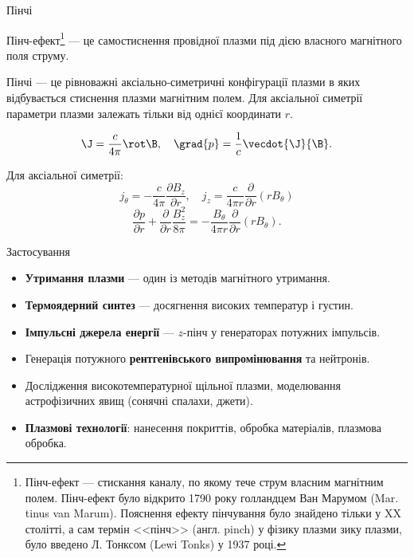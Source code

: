 \documentclass[]{beamer}
\begin{document}
\begin{frame}{Пінчі}
    \begin{block}{}
        Пінч-ефект\footnote{\justifying\tiny Пінч-ефект --- стискання каналу, по якому тече струм власним магнітним полем. Пінч-ефект було відкрито 1790 року голландцем Ван Марумом (Mar. tinus van Marum). Пояснення ефекту пінчування було знайдено тільки у XX столітті, а сам термін <<пінч>> (англ. pinch) у фізику плазми зику плазми, було введено Л. Тонксом (Lewi Tonks) у 1937 році.} --- це самостиснення провідної плазми під дією власного магнітного поля струму.
    \end{block}
	\begin{block}{}\justifying
		Пінчі --- це рівноважні аксіально-симетричні конфігурації плазми в яких відбувається стиснення плазми магнітним полем. Для аксіальної симетрії параметри плазми залежать тільки від однієї координати $r$.

		\begin{equation*}
			\J = \frac{c}{4\pi}\rot\B, \quad \grad{p} = \frac1c \vecdot{\J}{\B}.
		\end{equation*}

		Для аксіальної симетрії:
		\begin{equation*}
			j_{\theta} = -\frac{c}{4\pi}\frac{\partial B_z}{\partial r}, \quad j_z = \frac{c}{4\pi r} \frac{\partial }{\partial r}(r B_{\theta})
		\end{equation*}
		\begin{equation*}
			\frac{\partial p}{\partial r}  + \frac{\partial}{\partial r} \frac{B^2_z}{8\pi} = -\frac{B_{\theta}}{4\pi r}  \frac{\partial }{\partial r}(r B_{\theta}).
		\end{equation*}

	\end{block}
\end{frame}

\begin{frame}{Застосування}{}\small
    \begin{itemize}
    \item \textbf{Утримання плазми} --- один із методів магнітного утримання.
    \item \textbf{Термоядерний синтез} --- досягнення високих температур і густин.
    \item \textbf{Імпульсні джерела енергії} --- $z$-пінч у генераторах потужних імпульсів.
    \item Генерація потужного \textbf{рентгенівського випромінювання} та нейтронів.
    \item Дослідження високотемпературної щільної плазми, моделювання астрофізичних явищ (сонячні спалахи, джети).
    \item \textbf{Плазмові технології}: нанесення покриттів, обробка матеріалів, плазмова обробка.
\end{itemize}

\end{frame}
\end{document}
